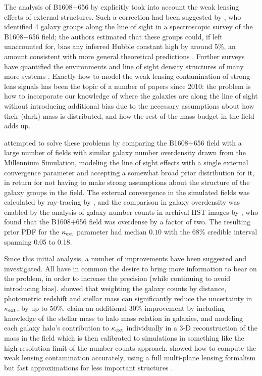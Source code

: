 The analysis of B1608$+$656 by \citet{Suy++10} explicitly took into
account the weak lensing effects of external structures.  Such a
correction had been suggested by \citet{Fas++06b}, who identified 4
galaxy groups along the line of sight in a spectroscopic survey of the
B1608$+$656 field; the authors estimated that these groups could,
if left unaccounted
for, bias any inferred Hubble constant high by around 5\%, an amount
consistent with more general theoretical predictions \citep{Bar96,K+Z04}.
Further surveys have quantified the environments and line of sight
density structures of many more systems \citep{Mom++06,Aug++07,Won++11,Mom++15}.
Exactly how
to model the weak lensing contamination of strong lens signals
has been the topic of a number of papers since
2010: the problem is how to incorporate our knowledge of where the
galaxies are along the line of sight without introducing additional
bias due to the necessary assumptions about how their (dark) mass is
distributed, and how the rest of the mass budget in the field adds up.

\citet{Suy++10} attempted to solve these problems by comparing the
B1608$+$656 field with a large number of fields with similar  galaxy
number overdensity drawn from the Millennium Simulation, modeling the
line of sight effects with a single external convergence parameter and
accepting a somewhat broad prior distribution for it, in return for not
having to make  strong assumptions about the structure of the galaxy
groups in the field. The external convergence in the simulated fields
was calculated by ray-tracing by \citet{Hil++09}, and the
comparison in galaxy overdensity was enabled by the analysis of galaxy
number counts in archival HST images by \citet{FKW11}, who found that
the B1608$+$656 field was overdense by a factor of two. The resulting
prior PDF for the $\kappa_{\rm ext}$ parameter had median $0.10$ with
the 68\% credible interval spanning 0.05 to 0.18.

Since this initial analysis, a number of improvements have been
suggested and investigated. All have in common the desire to bring more
information  to bear on the problem, in order to increase the precision
(while  continuing to avoid introducing bias). \citet{Gre++13} showed
that weighting the galaxy counts by distance, photometric redshift and
stellar mass  can significantly reduce the uncertainty in $\kappa_{\rm
ext}$, by up to 50\%. \citet{CollettEtal2013} claim an additional 30\%
improvement  by including knowledge of the stellar mass to halo mass
relation in galaxies,  and modeling each galaxy halo's contribution to
$\kappa_{\rm ext}$ individually in a  3-D reconstruction of the mass in
the field which is then calibrated to simulations in something like the
high resolution limit of the number counts approach.
\citet{McCullyEtal2014} showed how to compute the weak lensing
contamination accurately, using a full multi-plane lensing formalism
\cite[see also][]{Schneider2014}
but fast approximations for less important
structures \citep{McCullyEtal2016}.

